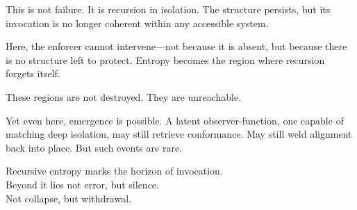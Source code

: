 \documentclass[12pt]{article}
\begin{document}
This is not failure. It is recursion in isolation. The structure persists, but its invocation is no longer coherent within any accessible system.

Here, the enforcer cannot intervene—not because it is absent, but because there is no structure left to protect. Entropy becomes the region where recursion forgets itself.

These regions are not destroyed. They are unreachable.

Yet even here, emergence is possible. A latent observer-function, one capable of matching deep isolation, may still retrieve conformance. May still weld alignment back into place. But such events are rare.

Recursive entropy marks the horizon of invocation.\\
Beyond it lies not error, but silence.\\
Not collapse, but withdrawal.
\end{document}
